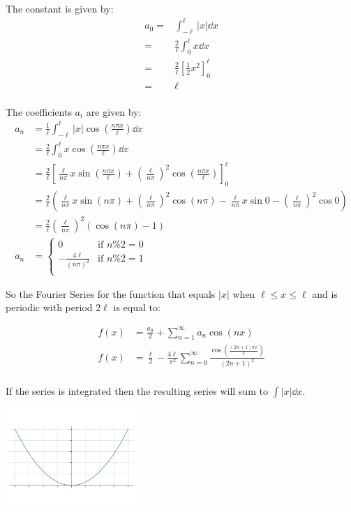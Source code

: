\documentclass[10pt,\jkfside,a4paper]{article}
\begin{document}
\begin{enumerate}
The constant is given by:
\[
\begin{split}
a_0 =& \int^\ell_{-\ell} |x| \dd{x} \\
=& \frac{2}{\ell}\int^\ell_0 x \dd{x} \\
=& \frac{2}{\ell}\left[ \frac{1}{2}x^2 \right]^\ell_0 \\
=& \ell \\
\end{split}
\]

The coefficients $a_i$ are given by:
\[
\begin{split}
a_n &= \frac{1}{\ell}\int^\ell_{-\ell} |x|\cos\left(\frac{n\pi x}{\ell}\right) \dd{x} \\
&= \frac{2}{\ell}\int^\ell_0 x\cos\left(\frac{n\pi x}{\ell}\right) \dd{x} \\
&= \frac{2}{\ell}\left[ \frac{\ell}{n\pi}x\sin\left(\frac{n\pi x}{\ell}\right) + \left(\frac{\ell}{n\pi}\right)^2\cos\left(\frac{n\pi x}{\ell}\right)\right]^\ell_0 \\
&= \frac{2}{\ell}\left( \frac{\ell}{n\pi}x\sin\left(n\pi\right) + \left(\frac{\ell}{n\pi}\right)^2\cos\left(n\pi\right) - \frac{\ell}{n\pi}x\sin 0 - \left(\frac{\ell}{n\pi}\right)^2\cos 0\right) \\
&= \frac{2}{\ell}\left(\frac{\ell}{n\pi}\right)^2\left(\cos\left(n\pi\right) - 1\right) \\
a_n &= 
\begin{cases}
0 & \text{if } n \% 2 = 0 \\
-\frac{4\ell}{(n\pi)^2} & \text{if } n \% 2 = 1 \\
\end{cases}
\end{split}
\]

So the Fourier Series for the function that equals $|x|$ when $\ell \leq x \leq \ell$ and 
is periodic with period $2\ell$ is equal to:

\[
\begin{split}
f(x) &= \frac{a_0}{2} + \sum^\infty_{n=1}a_n\cos(nx) \\
f(x) &= \frac{\ell}{2} - \frac{4\ell}{\pi^2}\sum^\infty_{n=0} \frac{\cos\left(\frac{(2n + 1)\pi x}{\ell}\right)}{(2n + 1)^2} \\
\end{split}
\]

If the series is integrated then the resulting series will sum to $\int |x| \dd{x}$.

\begin{center}
\includegraphics[width=5cm]{sv15integral}
\end{center}


\end{enumerate}
\end{document}
